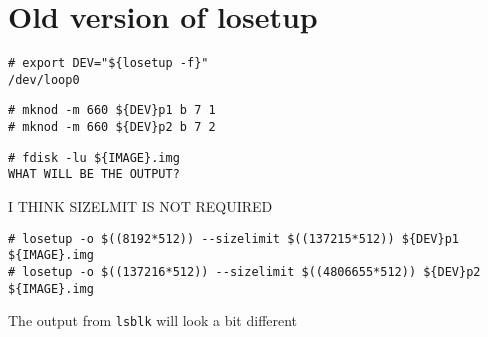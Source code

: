 \label{sec:testbed_http}


\section{Old version of losetup}

\begin{lstlisting}[]
# export DEV="${losetup -f}"
/dev/loop0
\end{lstlisting}
\FloatBarrier
\vspace{-5mm}

\begin{lstlisting}[]
# mknod -m 660 ${DEV}p1 b 7 1
# mknod -m 660 ${DEV}p2 b 7 2
\end{lstlisting}
\FloatBarrier
\vspace{-5mm}

\begin{lstlisting}[]
# fdisk -lu ${IMAGE}.img
WHAT WILL BE THE OUTPUT?
\end{lstlisting}
\FloatBarrier
\vspace{-5mm}

I THINK SIZELMIT IS NOT REQUIRED
\begin{lstlisting}[]
# losetup -o $((8192*512)) --sizelimit $((137215*512)) ${DEV}p1 ${IMAGE}.img
# losetup -o $((137216*512)) --sizelimit $((4806655*512)) ${DEV}p2 ${IMAGE}.img
\end{lstlisting}
\FloatBarrier
\vspace{-5mm}

The output from \texttt{lsblk} will look a bit different

